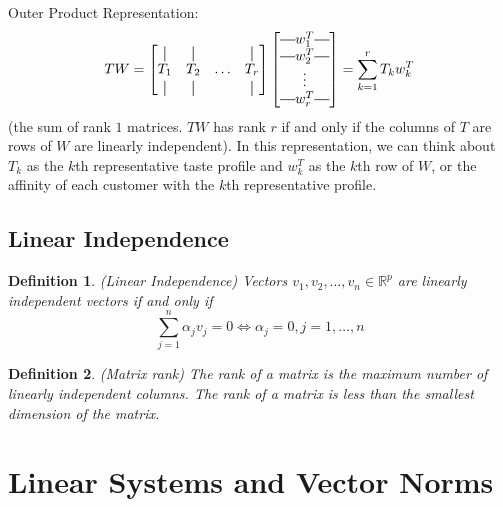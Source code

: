 \documentclass[12pt]{article}
\newtheorem{definition}{Definition}
\theoremstyle{definition}
\newcommand{\R}{\mathbb{R}}
\newcommand*{\vertbar}{\rule[-1ex]{0.5pt}{2.5ex}}
\newcommand*{\horzbar}{\rule[.5ex]{2.5ex}{0.5pt}}
\begin{document}
Outer Product Representation:
\begin{equation}
	TW = 
	\begin{bmatrix}
	\vertbar & \vertbar & & \vertbar\\
	T_1 & T_2 & \ldots & T_r \\
	\vertbar & \vertbar & & \vertbar\\	
	\end{bmatrix}
	\begin{bmatrix}
	\horzbar w_1^T \horzbar \\
	\horzbar w_2^T \horzbar \\
	\vdots \\
	\horzbar w_r^T \horzbar	
	\end{bmatrix}
	= \sum_{k=1}^r T_k w_k^T
\end{equation}
(the sum of rank $1$ matrices. $TW$ has rank $r$ if and only if the columns of $T$ are rows of $W$ are linearly independent). In this representation, we can think about $T_k$ as the $k$th representative taste profile and $w^T_k$ as the $k$th row of $W$, or the affinity of each customer with the $k$th representative profile. 

\subsection{Linear Independence}
\begin{definition}(Linear Independence)
Vectors $v_1, v_2, \ldots, v_n \in \R^p$ are linearly independent vectors if and only if
\begin{equation}
	\sum_{j=1}^n \alpha_j v_j = 0 \iff \alpha_j = 0, j=1,\ldots,n
\end{equation}	
\end{definition}

\begin{definition}(Matrix rank)
The rank of a matrix is the maximum number of linearly independent columns. The rank of a matrix is less than the smallest dimension of the matrix. 
\end{definition}


\section{Linear Systems and Vector Norms}
\end{document}
